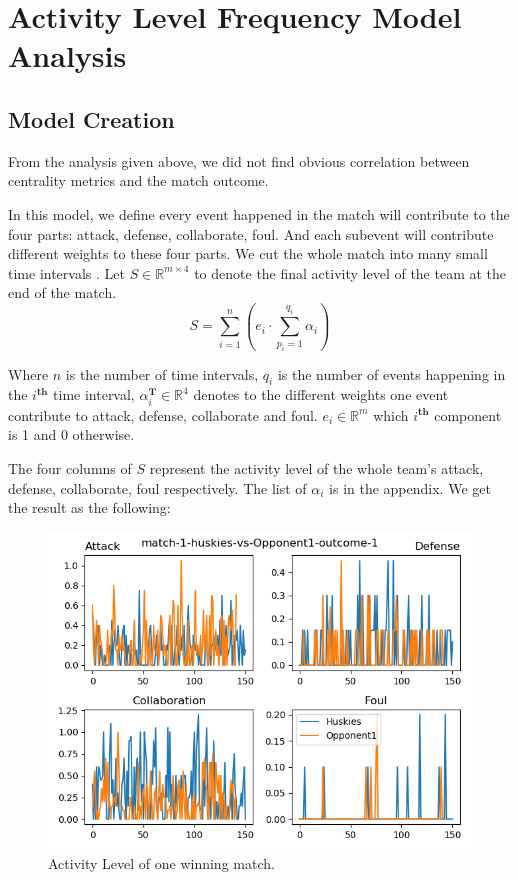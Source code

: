 \documentclass{mcmthesis}
\begin{document}
\section{Activity Level Frequency Model Analysis}\label{act-lvl-frq}
	\subsection{Model Creation}
	From the analysis given above, we did not find obvious correlation between centrality metrics and the match outcome.
	
	In this model, we define every event happened in the match will contribute to the four parts: attack, defense, collaborate, foul. And each subevent will contribute different weights to these four parts. We cut the whole match into many small time intervals . Let $S\in \mathbb{R}^{m\times 4}$ to denote the final activity level of the team at the end of the match. 
	$$S=\sum\limits_{i=1}^{n}\left(e_i\cdot\sum\limits_{p_i=1}^{q_i}\alpha_i\right)$$

	Where $n$ is the number of time intervals, $q_i$ is the number of events happening in the $i^\mathbf{th}$ time interval, $\alpha_i^\mathbf{T}\in\mathbb{R}^4$ denotes to the different weights one event contribute to attack, defense, collaborate and foul. $e_i\in\mathbb{R}^m$ which $i^\mathbf{th}$ component is 1 and 0 otherwise. 
	
	The four columns of $S$ represent the activity level of the whole team's attack, defense, collaborate, foul respectively. The list of $\alpha_i$ is in the appendix. We get the result as the following: 
	\begin{figure}[h!]
		\centering
		\includegraphics[scale=0.7]{images/match-1-huskies-vs-Opponent1-outcome-1.png}
		\caption{Activity Level of one winning match. }
	\end{figure} \\
	
\end{document}
